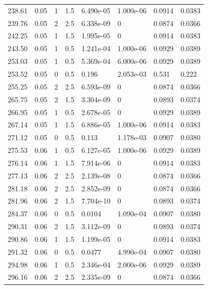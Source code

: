 \documentclass[preview]{standalone}
\begin{document}
{{{\begin{tabular}{L{1.2cm}C{1.2cm} C{0.3cm}C{0.5cm} C{1.4cm}C{1.4cm} C{1.4cm}C{1.4cm}}
  238.61  &  0.05  & 1     & 1.5 &  6.490e-05  & 1.000e-06  & 0.0914 &  0.0383   \\ 
  239.76  &  0.05  & 2     & 2.5 &  6.338e-09  & 0  & 0.0874 &  0.0366   \\ 
  242.25  &  0.05  & 1     & 1.5 &  1.995e-05  & 0  & 0.0914 &  0.0383   \\ 
  243.50  &  0.05  & 1     & 0.5 &  1.241e-04  & 1.000e-06  & 0.0929 &  0.0389   \\ 
  253.03  &  0.05  & 1     & 0.5 &  5.369e-04  & 6.000e-06  & 0.0929 &  0.0389   \\ 
  253.52  &  0.05  & 0     & 0.5 &  0.196  & 2.053e-03  & 0.531 &  0.222   \\ 
  255.25  &  0.05  & 2     & 2.5 &  6.593e-09  & 0  & 0.0874 &  0.0366   \\ 
  265.75  &  0.05  & 2     & 1.5 &  3.304e-09  & 0  & 0.0893 &  0.0374   \\ 
  266.95  &  0.05  & 1     & 0.5 &  2.678e-05  & 0  & 0.0929 &  0.0389   \\ 
  267.14  &  0.05  & 1     & 1.5 &  6.886e-05  & 1.000e-06  & 0.0914 &  0.0383   \\ 
  271.12  &  0.05  & 0     & 0.5 &  0.113  & 1.178e-03  & 0.0907 &  0.0380   \\ 
  275.53  &  0.06  & 1     & 0.5 &  6.127e-05  & 1.000e-06  & 0.0929 &  0.0389   \\ 
  276.14  &  0.06  & 1     & 1.5 &  7.914e-06  & 0  & 0.0914 &  0.0383   \\ 
  277.13  &  0.06  & 2     & 2.5 &  2.139e-08  & 0  & 0.0874 &  0.0366   \\ 
  281.18  &  0.06  & 2     & 2.5 &  2.852e-09  & 0  & 0.0874 &  0.0366   \\ 
  281.96  &  0.06  & 2     & 1.5 &  7.704e-10  & 0  & 0.0893 &  0.0374   \\ 
  284.37  &  0.06  & 0     & 0.5 &  0.0104  & 1.090e-04  & 0.0907 &  0.0380   \\ 
  290.31  &  0.06  & 2     & 1.5 &  3.112e-09  & 0  & 0.0893 &  0.0374   \\ 
  290.86  &  0.06  & 1     & 1.5 &  1.199e-05  & 0  & 0.0914 &  0.0383   \\ 
  291.32  &  0.06  & 0     & 0.5 &  0.0477  & 4.990e-04  & 0.0907 &  0.0380   \\ 
  294.98  &  0.06  & 1     & 0.5 &  2.346e-04  & 2.000e-06  & 0.0929 &  0.0389   \\ 
  296.16  &  0.06  & 2     & 2.5 &  2.335e-09  & 0  & 0.0874 &  0.0366   \\ 

\end{tabular}}}}
\end{document}
